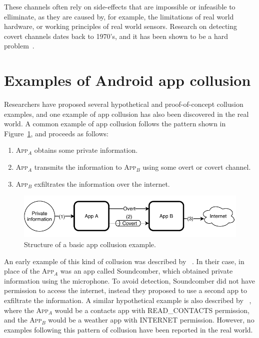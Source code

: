 \documentclass[article]{aaltoseries}
\newcommand{\Fref}[1]{Figure~\ref{#1}}
\newcommand{\app}[1]{A\textsc{pp}$_{#1}$\xspace}
\begin{document}
These channels often rely on side-effects that are impossible or infeasible to elliminate, as they are caused by, for example, the limitations of real world hardware, or working principles of real world sensors. Research on detecting covert channels dates back to 1970's, and it has been shown to be a hard problem~\cite{Marforio2012}.

\section{Examples of Android app collusion}
\label{sec:examples}

Researchers have proposed several hypothetical and proof-of-concept collusion examples, and one example of app collusion has also been discovered in the real world. A common example of app collusion follows the pattern shown in \Fref{fig:sample}, and proceeds as follows:
\begin{enumerate}[nosep,label={(\arabic*)}]
	\item \app{A} obtains some private information.
	\item \app{A} transmits the information to \app{B} using some overt or covert channel.
	\item \app{B} exfiltrates the information over the internet.
\end{enumerate}

\begin{figure}[ht]
	\centering
	\includegraphics[width=1.0\textwidth]{figures/Collusion1}
	\caption{Structure of a basic app collusion example.}
	\label{fig:sample}
\end{figure}

An early example of this kind of collusion was described by \citeauthor{Schlegel2011}~\cite{Schlegel2011}. In their case, in place of the \app{A} was an app called Soundcomber, which obtained private information using the microphone. To avoid detection, Soundcomber did not have permission to access the internet, instead they proposed to use a second app to exfiltrate the information. A similar hypothetical example is also described by \citeauthor{Asavoae2017}~\cite{Asavoae2017}, where the \app{A} would be a contacts app with READ\_CONTACTS permission, and the \app{B} would be a weather app with INTERNET permission. However, no examples following this pattern of collusion have been reported in the real world.
\end{document}
